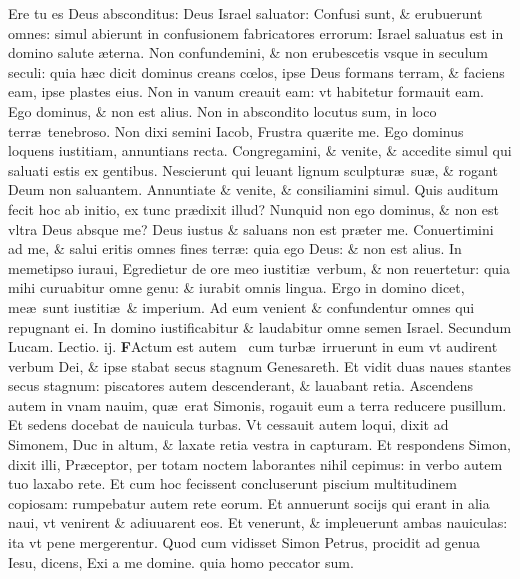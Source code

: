\documentclass[a5paper,10pt]{book}
\def\leftmarginnote{%
	\lrmarginnote{\hskip -\marginparsep \hskip -6.5em}}
\def\rightmarginnote{%
	\lrmarginnote{\hskip\columnwidth \hskip -1em}}
\def\ae{æ}
\def\oe{œ}
\begin{document}
\begin{multicols*}{2}
Ere\rightmarginnote{c. 45.} tu es Deus absconditus: Deus Israel saluator: Confusi sunt, \& erubuerunt omnes: simul abierunt in confusionem fabricatores errorum: Israel saluatus est in domino salute \ae terna.
Non confundemini, \& non erubescetis vsque in seculum seculi: quia h\ae c dicit dominus creans c\oe los, ipse Deus formans terram, \& faciens eam, ipse plastes eius.
Non in vanum creauit eam: vt habitetur formauit eam.
Ego dominus, \& non est alius. Non in abscondito locutus sum, in loco terr\ae \ tenebroso.
Non dixi semini Iacob, Frustra qu\ae rite me.
Ego dominus loquens iustitiam, annuntians recta.
Congregamini, \& venite, \& accedite simul qui saluati estis ex gentibus.
Nescierunt qui leuant lignum sculptur\ae \ su\ae , \& rogant Deum non saluantem.
Annuntiate \& venite, \& consiliamini simul.
Quis auditum fecit hoc ab initio, ex tunc pr\ae dixit illud?
Nunquid non ego dominus, \& non est vltra Deus absque me?
Deus iustus \& saluans non est pr\ae ter me.
Conuertimini ad me, \& salui eritis omnes fines terr\ae : quia ego Deus: \& non est alius.
In memetipso iuraui, Egredietur de ore meo iustiti\ae \ verbum, \& non reuertetur: quia mihi curuabitur omne genu: \& iurabit omnis lingua.
Ergo in domino dicet, me\ae \ sunt iustiti\ae \ \& imperium.
Ad eum venient \& confundentur omnes qui repugnant ei.
In domino iustificabitur \& laudabitur omne semen Israel.
\newline \color{red} Secundum Lucam. \hfill Lectio. ij. \color{black}
\vspace{-.25em}
\lettrine[lines=2]{\bfseries \color{red} F}{}Actum\leftmarginnote{\begin{flushright}c.5.a\end{flushright}} est autem \textdagger \ cum turb\ae \ irruerunt in eum vt audirent verbum Dei, \& ipse stabat secus stagnum Genesareth.
Et vidit duas naues stantes secus stagnum: piscatores autem descenderant, \& lauabant retia.
Ascendens autem in vnam nauim, qu\ae \ erat Simonis, rogauit eum a terra reducere pusillum. Et sedens docebat de nauicula turbas.
Vt cessauit autem loqui, dixit ad Simonem, Duc in altum, \& laxate retia vestra in capturam.
Et respondens Simon, dixit illi, Pr\ae ceptor, per totam noctem laborantes nihil cepimus: in verbo autem tuo laxabo rete.
Et cum hoc fecissent concluserunt piscium multitudinem copiosam: rumpebatur autem rete eorum.
Et annuerunt socijs qui erant in alia naui, vt venirent \& adiuuarent eos.
Et venerunt, \& impleuerunt ambas nauiculas: ita vt pene mergerentur.
Quod cum vidisset Simon Petrus, procidit ad genua Iesu, dicens, Exi a me domine. quia homo peccator sum.

\end{multicols*}
\end{document}
